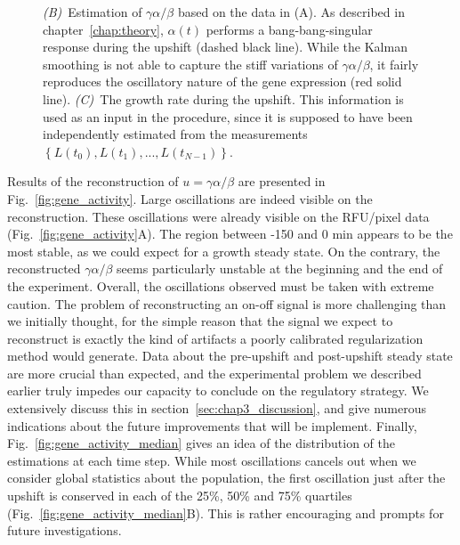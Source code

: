 \begin{figure}[p]
{\textit{(B)}~Estimation of $\gamma \alpha / \beta$ based on the data in (A).
As described in chapter~\ref{chap:theory}, $\alpha (t)$ performs a bang-bang-singular response during the upshift (dashed black line).
While the Kalman smoothing is not able to capture the stiff variations of $\gamma \alpha / \beta$, it fairly reproduces the oscillatory nature of the gene expression (red solid line).
\textit{(C)}~The growth rate during the upshift.
This information is used as an input in the procedure, since it is supposed to have been independently estimated from the measurements $\left\{L(t_0), L(t_1), ..., L(t_{N-1}) \right\}$.
}
\label{fig:synthetic_upshift}
\end{figure}

Results of the reconstruction of $u = \gamma \alpha / \beta$ are presented in Fig.~\ref{fig:gene_activity}.
Large oscillations are indeed visible on the reconstruction.
These oscillations were already visible on the RFU/pixel data (Fig.~\ref{fig:gene_activity}A).
The region between -150 and 0 min appears to be the most stable, as we could expect for a growth steady state.
On the contrary, the reconstructed $\gamma \alpha / \beta$ seems particularly unstable at the beginning and the end of the experiment.
Overall, the oscillations observed must be taken with extreme caution.
The problem of reconstructing an on-off signal is more challenging than we initially thought, for the simple reason that the signal we expect to reconstruct is exactly the kind of artifacts a poorly calibrated regularization method would generate.
Data about the pre-upshift and post-upshift steady state are more crucial than expected, and the experimental problem we described earlier truly impedes our capacity to conclude on the regulatory strategy.
We extensively discuss this in section~\ref{sec:chap3_discussion}, and give numerous indications about the future improvements that will be implement.
Finally, Fig.~\ref{fig:gene_activity_median} gives an idea of the distribution of the estimations at each time step.
While most oscillations cancels out when we consider global statistics about the population, the first oscillation just after the upshift is conserved in each of the 25\%, 50\% and 75\% quartiles (Fig.~\ref{fig:gene_activity_median}B).
This is rather encouraging and prompts for future investigations.


